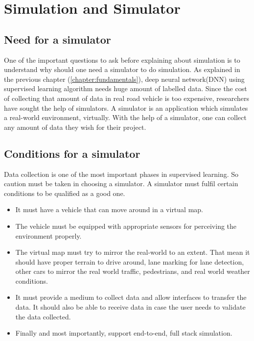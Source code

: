 \chapter{Simulation and Simulator}

\section{Need for a simulator}
One of the important questions to ask before explaining about simulation is to understand
why should one need a simulator to do simulation. As explained in the previous chapter
(\ref{chapter:fundamentals}), deep neural network(DNN) using supervised learning algorithm
needs huge amount of labelled data. Since the cost of collecting that amount of data in
real road vehicle is too expensive, researchers have sought the help of simulators. A
simulator is an application which simulates a real-world environment, virtually. With the
help of a simulator, one can collect any amount of data they wish for their project.

\section{Conditions for a simulator}

Data collection is one of the most important phases in supervised learning. So caution must
be taken in choosing a simulator. A simulator must fulfil certain conditions to be
qualified as a good one.
\begin{itemize}
    \item It must have a vehicle that can move around in a virtual map.
    \item The vehicle must be equipped with appropriate sensors for perceiving the
        environment properly.
    \item The virtual map must try to mirror the real-world to an extent. That mean it
        should have proper terrain to drive around, lane marking for lane detection, other
        cars to mirror the real world traffic, pedestrians, and real world weather
        conditions.
    \item It must provide a medium to collect data and allow interfaces to transfer the
        data. It should also be able to receive data in case the user needs to validate
        the data collected.
    \item Finally and most importantly, support end-to-end, full stack simulation.
\end{itemize}

